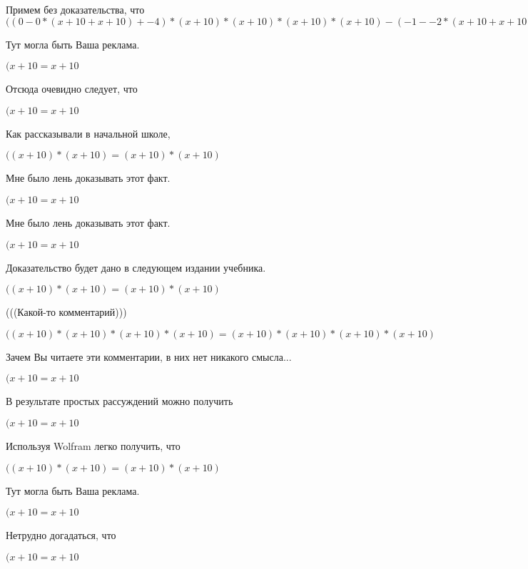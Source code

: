 \documentclass[12pt,a4paper,fleqn]{article}
\theoremstyle{definition}
\begin{document}
Примем без доказательства, что
$(( 0  -  0  * ( x  +  10  +  x  +  10 ) +  -4 ) * ( x  +  10 ) * ( x  +  10 ) * ( x  +  10 ) * ( x  +  10 ) - ( -1  -  -2  * ( x  +  10  +  x  +  10 )) * (( 1  * ( x  +  10 ) + ( x  +  10 ) *  1 ) * ( x  +  10 ) * ( x  +  10 ) + ( x  +  10 ) * ( x  +  10 ) * ( 1  * ( x  +  10 ) + ( x  +  10 ) *  1 )) = ( 0  -  0  * ( x  +  10  +  x  +  10 ) +  -4 ) * ( x  +  10 ) * ( x  +  10 ) * ( x  +  10 ) * ( x  +  10 ) - ( -1  -  -2  * ( x  +  10  +  x  +  10 )) * (( 1  * ( x  +  10 ) + ( x  +  10 ) *  1 ) * ( x  +  10 ) * ( x  +  10 ) + ( x  +  10 ) * ( x  +  10 ) * ( 1  * ( x  +  10 ) + ( x  +  10 ) *  1 ))$

Тут могла быть Ваша реклама.

$( x  +  10  =  x  +  10 $

Отсюда очевидно следует, что

$( x  +  10  =  x  +  10 $

Как рассказывали в начальной школе,

$(( x  +  10 ) * ( x  +  10 ) = ( x  +  10 ) * ( x  +  10 )$

Мне было лень доказывать этот факт.

$( x  +  10  =  x  +  10 $

Мне было лень доказывать этот факт.

$( x  +  10  =  x  +  10 $

Доказательство будет дано в следующем издании учебника.

$(( x  +  10 ) * ( x  +  10 ) = ( x  +  10 ) * ( x  +  10 )$

(((Какой-то комментарий)))

$(( x  +  10 ) * ( x  +  10 ) * ( x  +  10 ) * ( x  +  10 ) = ( x  +  10 ) * ( x  +  10 ) * ( x  +  10 ) * ( x  +  10 )$

Зачем Вы читаете эти комментарии, в них нет никакого смысла...

$( x  +  10  =  x  +  10 $

В результате простых рассуждений можно получить

$( x  +  10  =  x  +  10 $

Используя Wolfram легко получить, что

$(( x  +  10 ) * ( x  +  10 ) = ( x  +  10 ) * ( x  +  10 )$

Тут могла быть Ваша реклама.

$( x  +  10  =  x  +  10 $

Нетрудно догадаться, что

$( x  +  10  =  x  +  10 $
\end{document}
